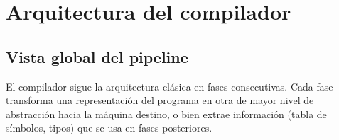 \chapter{Arquitectura del compilador}
\label{chap:arquitectura}

\section{Vista global del pipeline}

El compilador sigue la arquitectura clásica en fases consecutivas. Cada fase
transforma una representación del programa en otra de mayor nivel de abstracción
hacia la máquina destino, o bien extrae información (tabla de símbolos, tipos)
que se usa en fases posteriores.

